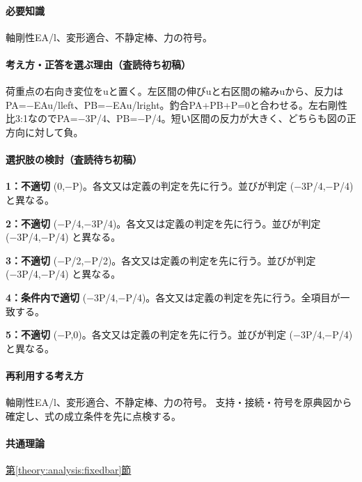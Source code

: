 \paragraph{必要知識} 軸剛性EA/l、変形適合、不静定棒、力の符号。

\paragraph{考え方・正答を選ぶ理由（査読待ち初稿）} 荷重点の右向き変位をuと置く。左区間の伸びuと右区間の縮みuから、反力はPA=−EAu/lleft、PB=−EAu/lright。釣合PA+PB+P=\allowbreak{}0と合わせる。左右剛性比3:1なのでPA=−3P/4、PB=−P/4。短い区間の反力が大きく、どちらも図の正方向に対して負。

\paragraph{選択肢の検討（査読待ち初稿）}\mbox{}\par

\noindent\textbf{1：不適切} (0,−P)。各文又は定義の判定を先に行う。並びが判定 (−3P/4,−P/4) と異なる。\par

\noindent\textbf{2：不適切} (−P/4,−3P/4)。各文又は定義の判定を先に行う。並びが判定 (−3P/4,−P/4) と異なる。\par

\noindent\textbf{3：不適切} (−P/2,−P/2)。各文又は定義の判定を先に行う。並びが判定 (−3P/4,−P/4) と異なる。\par

\noindent\textbf{4：条件内で適切} (−3P/4,−P/4)。各文又は定義の判定を先に行う。全項目が一致する。\par

\noindent\textbf{5：不適切} (−P,0)。各文又は定義の判定を先に行う。並びが判定 (−3P/4,−P/4) と異なる。\par

\paragraph{再利用する考え方} 軸剛性EA/l、変形適合、不静定棒、力の符号。 支持・接続・符号を原典図から確定し、式の成立条件を先に点検する。

\paragraph{共通理論} \hyperref[theory:analysis:fixedbar]{第\ref*{theory:analysis:fixedbar}節}

